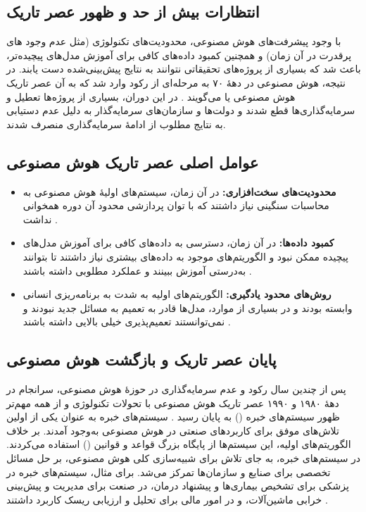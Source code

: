 \subsection{انتظارات بیش از حد و ظهور عصر تاریک}

با وجود پیشرفت‌های هوش مصنوعی، محدودیت‌های تکنولوژی (مثل عدم وجود های پرقدرت در آن زمان) و همچنین کمبود داده‌های کافی برای آموزش مدل‌های پیچیده‌تر، باعث شد که بسیاری از پروژه‌های تحقیقاتی نتوانند به نتایج پیش‌بینی‌شده دست یابند. در نتیجه، هوش مصنوعی در دههٔ ۷۰ به مرحله‌ای از رکود وارد شد که به آن عصر تاریک هوش مصنوعی یا  می‌گویند \cite{lighthill1973artificial,crevier1993ai}. در این دوران، بسیاری از پروژه‌ها تعطیل و سرمایه‌گذاری‌ها قطع شدند و دولت‌ها و سازمان‌های سرمایه‌گذار به دلیل عدم دستیابی به نتایج مطلوب از ادامهٔ سرمایه‌گذاری منصرف شدند.

\subsection{عوامل اصلی عصر تاریک هوش مصنوعی}

\begin{itemize}
	\item \textbf{محدودیت‌های سخت‌افزاری:}  
	در آن زمان، سیستم‌های اولیهٔ هوش مصنوعی به محاسبات سنگینی نیاز داشتند که با توان پردازشی محدود آن دوره همخوانی نداشت \cite{nilsson2010quest}.
	
	\item \textbf{کمبود داده‌ها:}  
	در آن زمان، دسترسی به داده‌های کافی برای آموزش مدل‌های پیچیده ممکن نبود و الگوریتم‌های موجود به داده‌های بیشتری نیاز داشتند تا بتوانند به‌درستی آموزش ببینند و عملکرد مطلوبی داشته باشند \cite{crevier1993ai}.
	
	\item \textbf{روش‌های محدود یادگیری:}  
	الگوریتم‌های اولیه به شدت به برنامه‌ریزی انسانی وابسته بودند و در بسیاری از موارد، مدل‌ها قادر به تعمیم به مسائل جدید نبودند و نمی‌توانستند تعمیم‌پذیری خیلی بالایی داشته باشند \cite{russell2016artificial}.
\end{itemize}

\subsection{پایان عصر تاریک و بازگشت هوش مصنوعی}

پس از چندین سال رکود و عدم سرمایه‌گذاری در حوزهٔ هوش مصنوعی، سرانجام در دههٔ ۱۹۸۰ و ۱۹۹۰ عصر تاریک هوش مصنوعی با تحولات تکنولوژی و از همه مهم‌تر ظهور سیستم‌های خبره () به پایان رسید \cite{feigenbaum1983handbook}. سیستم‌های خبره به عنوان یکی از اولین تلاش‌های موفق برای کاربردهای صنعتی در هوش مصنوعی به‌وجود آمدند. بر خلاف الگوریتم‌های اولیه، این سیستم‌ها از پایگاه بزرگ قواعد و قوانین () استفاده می‌کردند. در سیستم‌های خبره، به جای تلاش برای شبیه‌سازی کلی هوش مصنوعی، بر حل مسائل تخصصی برای صنایع و سازمان‌ها تمرکز می‌شد. برای مثال، سیستم‌های خبره در پزشکی برای تشخیص بیماری‌ها و پیشنهاد درمان، در صنعت برای مدیریت و پیش‌بینی خرابی ماشین‌آلات، و در امور مالی برای تحلیل و ارزیابی ریسک کاربرد داشتند \cite{mccorduck2004machines}.

